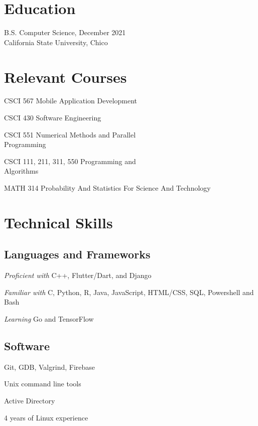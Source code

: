 \documentclass[letterpaper]{article}
\renewenvironment{itemize}{
  \begin{list}{}{
    \setlength{\leftmargin}{1.5em}
  }
}{
  \end{list}
}
\begin{document}
\begin{minipage}[t]{0.475\linewidth}
    \section*{Education}
    \begin{itemize}
    \item[$\bullet$] B.S. Computer Science, December 2021\\
        California State University, Chico
    \end{itemize}
    \section*{Relevant Courses}
    \begin{itemize}
        \item[$\bullet$] CSCI 567 Mobile Application Development
        \item[$\bullet$] CSCI 430 Software Engineering
        \item[$\bullet$] CSCI 551 Numerical Methods and Parallel\\Programming
        \item[$\bullet$] CSCI 111, 211, 311, 550 Programming and\\Algorithms
        \item[$\bullet$] MATH 314 Probability And Statistics For Science And Technology
    \end{itemize}
\end{minipage}
\hspace{0.5cm}
\begin{minipage}[t]{0.475\linewidth}
    \section*{Technical Skills}
    \subsection*{Languages and Frameworks}
    \begin{itemize}
        \item[$\bullet$] \emph{Proficient with} C++, Flutter/Dart, and Django
        \item[$\bullet$] \emph{Familiar with} C, Python, R, Java, JavaScript, HTML/CSS, SQL, Powershell and Bash
        \item[$\bullet$] \emph{Learning} Go and TensorFlow
    \end{itemize}
    \subsection*{Software}
    \begin{itemize}
        \item[$\bullet$] Git, GDB, Valgrind, Firebase
        \item[$\bullet$] Unix command line tools
        \item[$\bullet$] Active Directory
        \item[$\bullet$] 4 years of Linux experience
    \end{itemize}
\end{minipage}
\end{document}

